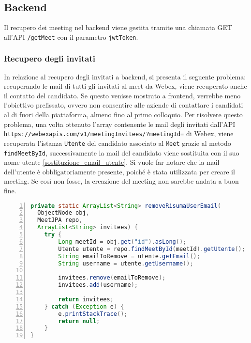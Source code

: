 \subsection{Backend}
Il recupero dei meeting nel backend viene gestita tramite una chiamata 
GET all'API \texttt{\//getMeet} con il parametro \texttt{jwtToken}.



\subsubsection{Recupero degli invitati}
\label{sec:recupero_invitati_backend}
In relazione al recupero degli invitati a backend, si presenta il seguente problema: recuperando le mail di tutti
gli invitati al meet da Webex, viene recuperato anche il contatto del candidato. Se questo venisse mostrato 
a frontend, verrebbe meno l'obiettivo prefissato, ovvero non consentire alle aziende di contattare i candidati
al di fuori della piattaforma, almeno fino al primo colloquio. Per risolvere questo problema, una volta 
ottenuto l'array contenente le mail degli invitati dall'API \texttt{https://webexapis.com/v1/meetingInvitees/?meetingId=} di Webex, 
viene recuperata l'istanza \texttt{Utente} del candidato associato al \texttt{Meet} grazie al metodo \texttt{findMeetById}, 
successivamente la mail del candidato viene sostituita con il suo nome utente \ref{sostituzione_email_utente}.
Si vuole far notare che la mail dell'utente è obbligatoriamente presente, poiché è stata utilizzata per creare il meeting.
Se così non fosse, la creazione del meeting non sarebbe andata a buon fine.
\begin{lstlisting}[language=java, frame=lines, basicstyle=\ttfamily\scriptsize, numbers=left, 
	caption={sostituzione email utente}, label={sostituzione_email_utente}]
private static ArrayList<String> removeRisumaUserEmail(
  ObjectNode obj, 
  MeetJPA repo, 
  ArrayList<String> invitees) {
	try {
		Long meetId = obj.get("id").asLong();
		Utente utente = repo.findMeetById(meetId).getUtente();
		String emailToRemove = utente.getEmail();
		String username = utente.getUsername();
		
		invitees.remove(emailToRemove);
		invitees.add(username);
			
		return invitees;
	} catch (Exception e) {
		e.printStackTrace();
		return null;
	}
}
\end{lstlisting}